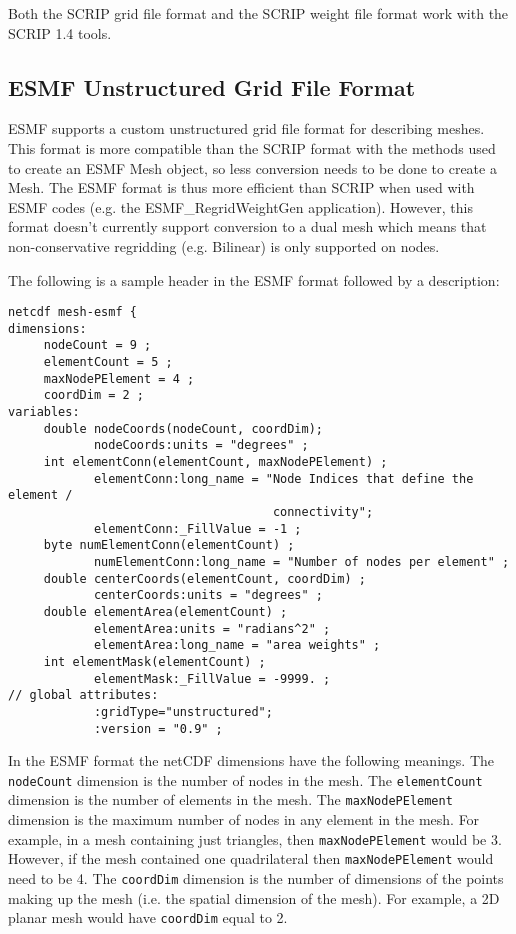 Both the SCRIP grid file format and the SCRIP weight file format work with the SCRIP 1.4 tools.

\subsection{ESMF Unstructured Grid File Format}\label{sec:fileformat:esmf}

ESMF supports a custom unstructured grid file format for describing meshes. This format is more compatible than the SCRIP format with the methods used to create an ESMF Mesh object, so less conversion needs to be done to create a Mesh.
The ESMF format is thus more efficient than SCRIP when used with ESMF codes (e.g. the ESMF\_RegridWeightGen application). However, this
format doesn't currently support conversion to a dual mesh which means that non-conservative regridding (e.g. Bilinear) is only supported on nodes.

The following is a sample header in the ESMF format followed by a description:

\begin{verbatim}
netcdf mesh-esmf {
dimensions:
     nodeCount = 9 ;
     elementCount = 5 ;
     maxNodePElement = 4 ;
     coordDim = 2 ;
variables:
     double nodeCoords(nodeCount, coordDim);
            nodeCoords:units = "degrees" ;
     int elementConn(elementCount, maxNodePElement) ;
            elementConn:long_name = "Node Indices that define the element /
                                     connectivity";
            elementConn:_FillValue = -1 ;
     byte numElementConn(elementCount) ;
            numElementConn:long_name = "Number of nodes per element" ;
     double centerCoords(elementCount, coordDim) ;
            centerCoords:units = "degrees" ;
     double elementArea(elementCount) ;
            elementArea:units = "radians^2" ;
            elementArea:long_name = "area weights" ;
     int elementMask(elementCount) ;
            elementMask:_FillValue = -9999. ;
// global attributes:
            :gridType="unstructured";
            :version = "0.9" ;
\end{verbatim}

 In the ESMF format the netCDF dimensions have the following meanings. The {\tt nodeCount} dimension is the number of nodes in the mesh.
 The {\tt elementCount} dimension is the number of elements in the mesh. The {\tt maxNodePElement} dimension is the maximum number
 of nodes in any element in the mesh. For example, in a mesh containing just triangles, then {\tt maxNodePElement} would be 3. However,
 if the mesh contained one quadrilateral then {\tt maxNodePElement} would need to be 4. The {\tt coordDim} dimension is the number of dimensions
 of the points making up the mesh (i.e. the spatial dimension of the mesh). For example, a 2D planar mesh would have {\tt coordDim} equal to 2.


